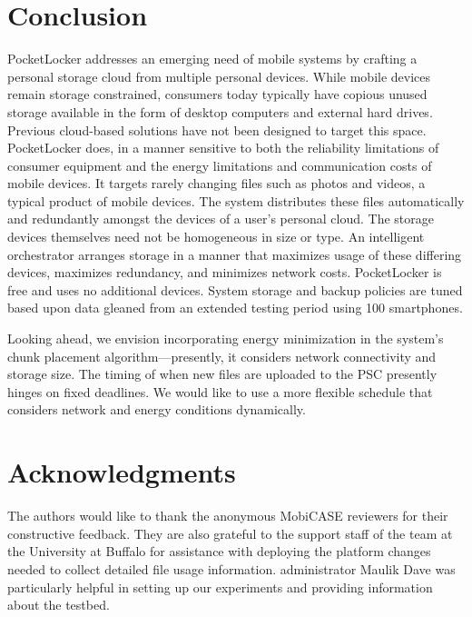 
\section{Conclusion}
\label{sec-conclusion}

PocketLocker addresses an emerging need of mobile systems by crafting a
personal storage cloud from multiple personal devices.  While mobile devices
remain storage constrained, consumers today typically have copious unused
storage available in the form of desktop computers and external hard drives.
Previous cloud-based solutions have not been designed to target this space.
PocketLocker does, in a manner sensitive to both the reliability limitations of
consumer equipment and the energy limitations and communication costs of mobile
devices. It targets rarely changing files such as photos and videos, a typical
product of mobile devices.  The system distributes these files automatically
and redundantly amongst the devices of a user's personal cloud. The storage
devices themselves need not be homogeneous in size or type.  An intelligent
orchestrator arranges storage in a manner that maximizes usage of these
differing devices, maximizes redundancy, and minimizes network costs.
PocketLocker is free and uses no additional devices.  System storage and backup
policies are tuned based upon data gleaned from an extended testing period
using 100 smartphones.

Looking ahead, we envision incorporating energy minimization in the system's
chunk placement algorithm---presently, it considers network connectivity and
storage size.  The timing of when new files are uploaded to the PSC presently
hinges on fixed deadlines.  We would like to use a more flexible schedule that
considers network and energy conditions dynamically.

\section*{Acknowledgments}
The authors would like to thank the anonymous MobiCASE reviewers for their
constructive feedback. They are also grateful to the support staff of the
\PhoneLab{} team at the University at Buffalo for assistance with deploying the
platform changes needed to collect detailed file usage information. \PhoneLab{}
administrator Maulik Dave was particularly helpful in setting up our
experiments and providing information about the testbed.


